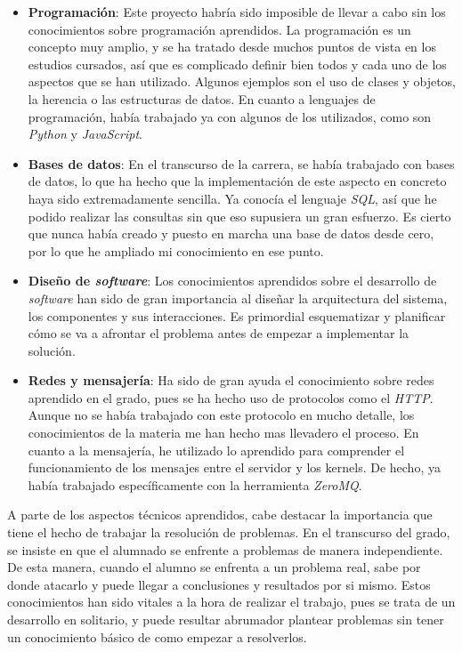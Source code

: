 \documentclass[11pt,spanish,listoffigures]{tfgetsinf}
\begin{document}
\begin{itemize}

\item \textbf{Programación}: Este proyecto habría sido imposible de llevar a cabo sin los conocimientos sobre programación aprendidos. La programación es un concepto muy amplio, y se ha tratado desde muchos puntos de vista en los estudios cursados, así que es complicado definir bien todos y cada uno de los aspectos que se han utilizado. Algunos ejemplos son el uso de clases y objetos, la herencia o las estructuras de datos. En cuanto a lenguajes de programación, había trabajado ya con algunos de los utilizados, como son \textit{Python} y \textit{JavaScript}.

\item \textbf{Bases de datos}: En el transcurso de la carrera, se había trabajado con bases de datos, lo que ha hecho que la implementación de este aspecto en concreto haya sido extremadamente sencilla. Ya conocía el lenguaje \textit{SQL}, así que he podido realizar las consultas sin que eso supusiera un gran esfuerzo. Es cierto que nunca había creado y puesto en marcha una base de datos desde cero, por lo que he ampliado mi conocimiento en ese punto.

\item \textbf{Diseño de \textit{software}}: Los conocimientos aprendidos sobre el desarrollo de \textit{software} han sido de gran importancia al diseñar la arquitectura del sistema, los componentes y sus interacciones. Es primordial esquematizar y planificar cómo se va a afrontar el problema antes de empezar a implementar la solución.

\item \textbf{Redes y mensajería}: Ha sido de gran ayuda el conocimiento sobre redes aprendido en el grado, pues se ha hecho uso de protocolos como el \textit{HTTP}. Aunque no se había trabajado con este protocolo en mucho detalle, los conocimientos de la materia me han hecho mas llevadero el proceso. En cuanto a la mensajería, he utilizado lo aprendido para comprender el funcionamiento de los mensajes entre el servidor y los kernels. De hecho, ya había trabajado específicamente con la herramienta \textit{ZeroMQ}.

\end{itemize}

A parte de los aspectos técnicos aprendidos, cabe destacar la importancia que tiene el hecho de trabajar la resolución de problemas. En el transcurso del grado, se insiste en que el alumnado se enfrente a problemas de manera independiente. De esta manera, cuando el alumno se enfrenta a un problema real, sabe por donde atacarlo y puede llegar a conclusiones y resultados por si mismo. Estos conocimientos han sido vitales a la hora de realizar el trabajo, pues se trata de un desarrollo en solitario, y puede resultar abrumador plantear problemas sin tener un conocimiento básico de como empezar a resolverlos.
\end{document}
